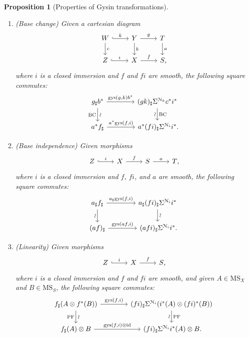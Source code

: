 \documentclass{amsart}
\numberwithin{equation}{section}
\theoremstyle{plain}
\newtheorem{proposition}[equation]{Proposition}
\theoremstyle{definition}
\let\scr=\mathcal
\def\id{\mathrm{id}}
\def\MS{\mathrm{MS}}
\begin{document}
\begin{proposition}[Properties of Gysin transformations]
	\label{prop:gysin-trans}
	\leavevmode
	\begin{enumerate}
		\item \textnormal{(Base change)} Given a cartesian diagram
		\[
		\begin{tikzcd}
			W \ar[hook]{r}{k} \ar{d}{c} & Y \ar{r}{g} \ar{d}{b} & T \ar{d}{a} \\
			Z \ar[hook]{r}{i} & X \ar{r}{f} & S\rlap,
		\end{tikzcd}
		\]
		where $i$ is a closed immersion and $f$ and $fi$ are smooth, the following square commutes:
		\[
		\begin{tikzcd}[column sep=4em]
			g_\sharp b^* \ar{r}{\mathrm{gys}(g,k)b^*} \ar{d}[sloped]{\sim}[swap]{\mathrm{BC}} & (gk)_\sharp\Sigma^{\scr N_k}c^*i^* \ar{d}{\mathrm{BC}}[swap,sloped]{\sim} \\
			a^*f_\sharp \ar{r}{a^*\mathrm{gys}(f,i)} & a^*(fi)_\sharp\Sigma^{\scr N_i}i^*\rlap.
		\end{tikzcd}
		\]
		\item \textnormal{(Base independence)} Given morphisms
		\[
		\begin{tikzcd}
			Z \ar[hook]{r}{i} & X \ar{r}{f} & S \ar{r}{a} & T\rlap,
		\end{tikzcd}
		\]
		where $i$ is a closed immersion and $f$, $fi$, and $a$ are smooth, the following square commutes:
		\[
		\begin{tikzcd}[column sep=4em]
			a_\sharp f_\sharp \ar{r}{a_\sharp\mathrm{gys}(f,i)} \ar{d}[swap,sloped]{\sim} & a_\sharp(fi)_\sharp\Sigma^{\scr N_i}i^* \ar{d}[sloped]{\sim} \\
			(af)_\sharp \ar{r}{\mathrm{gys}(af,i)} & (afi)_\sharp\Sigma^{\scr N_i}i^*\rlap.
		\end{tikzcd}
		\]
		\item \textnormal{(Linearity)} Given morphisms
		\[
		\begin{tikzcd}
			Z \ar[hook]{r}{i} & X \ar{r}{f} & S\rlap,
		\end{tikzcd}
		\]
		where $i$ is a closed immersion and $f$ and $fi$ are smooth, and given $A\in\MS_X$ and $B\in \MS_S$, the following square commutes:
		\[
		\begin{tikzcd}[column sep=4em]
			f_\sharp(A\otimes f^*(B)) \ar{d}[sloped]{\sim}[swap]{\mathrm{PF}} \ar{r}{\mathrm{gys}(f,i)} & (fi)_\sharp\Sigma^{\scr N_i}(i^*(A)\otimes (fi)^*(B)) \ar{d}{\mathrm{PF}}[swap,sloped]{\sim} \\
			f_\sharp(A) \otimes B \ar{r}{\mathrm{gys}(f,i)\otimes\id} & (fi)_\sharp \Sigma^{\scr N_i}i^*(A)\otimes B\rlap.

\end{tikzcd}\]
\end{enumerate}
\end{proposition}
\end{document}
